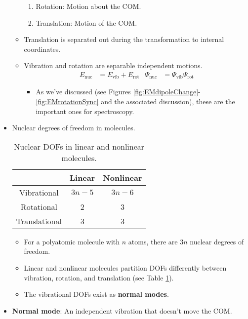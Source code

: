 \documentclass[../notes.tex]{subfiles}
\begin{document}
\begin{itemize}
\begin{itemize}
\begin{enumerate}
            \item Rotation: Motion about the COM.
            \item Translation: Motion of the COM.
        \end{enumerate}
        \item Translation is separated out during the transformation to internal coordinates.
        \item Vibration and rotation are separable independent motions.
        \begin{align*}
            E_\text{nuc} &= E_\text{vib}+E_\text{rot}&
            \Psi_\text{nuc} &= \Psi_\text{vib}\Psi_\text{rot}
        \end{align*}
        \begin{itemize}
            \item As we've discussed (see Figures \ref{fig:EMdipoleChange}-\ref{fig:EMrotationSync} and the associated discussion), these are the important ones for spectroscopy.
        \end{itemize}
    \end{itemize}
    \item Nuclear degrees of freedom in molecules.
    \begin{table}[h!]
        \centering
        \small
        \renewcommand{\arraystretch}{1.2}
        \begin{tabular}{c|cc}
                          & Linear & Nonlinear\\
            \hline
            Vibrational   & $3n-5$ & $3n-6$   \\
            Rotational    & 2      & 3        \\
            Translational & 3      & 3        \\
        \end{tabular}
        \caption{Nuclear DOFs in linear and nonlinear molecules.}
        \label{tab:linearNonDOF}
    \end{table}
    \begin{itemize}
        \item For a polyatomic molecule with $n$ atoms, there are $3n$ nuclear degrees of freedom.
        \item Linear and nonlinear molecules partition DOFs differently between vibration, rotation, and translation (see Table \ref{tab:linearNonDOF}).
        \item The vibrational DOFs exist as \textbf{normal modes}.
    \end{itemize}
    \item \textbf{Normal mode}: An independent vibration that doesn't move the COM.

\end{itemize}
\end{document}
